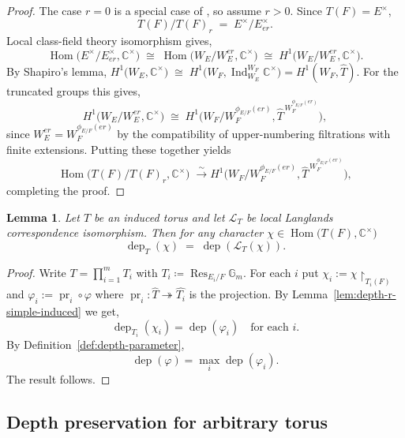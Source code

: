 \documentclass[american]{article}
\numberwithin{equation}{section}
\numberwithin{figure}{section}
\theoremstyle{plain}
\newtheorem{lemma}[theorem]{Lemma}
\theoremstyle{definition}
\theoremstyle{remark}
\DeclareMathOperator{\Hom}{Hom}
\DeclareMathOperator{\dep}{dep}
\DeclareMathOperator{\Res}{Res}
\DeclareMathOperator{\Ind}{Ind}
\DeclareMathOperator{\pr}{pr}
\newcommand{\CC}{\mathbb{C}}
\newcommand{\Gm}{\mathbb{G}_m}
\begin{document}
\begin{proof}
The case \(r=0\) is a special case of \cite[Theorem 1]{MM15}, so assume  \(r>0\).
Since \(T(F)=E^\times\),
\[
T(F)/T(F)_r
\;=\;
E^\times/E^\times_{e r}.
\]Local class-field theory isomorphism gives,
\[
\Hom\!\bigl(E^\times/E^\times_{e r},\CC^\times\bigr)
\;\cong\;
\Hom\!\bigl(W_E/W_E^{e r},\CC^\times\bigr)
\;\cong\;
H^1\!\bigl(W_E/W_E^{e r},\CC^\times\bigr).
\]
By Shapiro's lemma,
\( H^1\!\bigl(W_E,\CC^\times\bigr)\;\cong\;
   H^1\!\bigl(W_F,\Ind_{W_E}^{W_F}\CC^\times\bigr)=H^1(W_F,\widehat{T}) \).
For the truncated groups this gives,
\[
H^1\!\bigl(W_E/W_E^{e r},\CC^\times\bigr)
\;\cong\;
H^1\!\bigl(
   W_F/W_F^{\phi_{E/F}(e r)},
   \widehat{T}^{\,W_F^{\phi_{E/F}(e r)}}
\bigr),
\]
since \(W_E^{e r}=W_F^{\phi_{E/F}(e r)}\) by the compatibility of
upper-numbering filtrations with finite extensions.
Putting these together yields
\[
\Hom\!\bigl(T(F)/T(F)_r,\CC^\times\bigr)
\;\xrightarrow{\;\sim\;}
H^1\!\bigl(
  W_F/W_F^{\phi_{E/F}(e r)},
  \widehat{T}^{\,W_F^{\phi_{E/F}(e r)}}
\bigr),
\]
completing the proof.
\end{proof}
\begin{lemma}\label{lem:depth-pres-ind}
Let \(T\) be an induced torus and let \(\mathcal{L}_T\) be local Langlands correspondence isomorphism. 
Then for any character \(\chi\in\Hom\!\bigl(T(F),\CC^\times\bigr)\)  
\[
\dep_T(\chi)\;=\;\dep(\mathcal{L}_T(\chi)).
\]
\end{lemma}

\begin{proof}
Write \(T=\prod_{i=1}^{m}T_i\) with \(T_i\coloneqq\Res_{E_i/F}\Gm\).  
For each \(i\) put \(\chi_i:=\chi\!\restriction_{T_i(F)}\) and 
\(\varphi_i:=\pr_i\circ\varphi\) where \(\pr_i:\widehat{T}\twoheadrightarrow\widehat{T_i}\) is the
projection.  By Lemma~\ref{lem:depth-r-simple-induced} we get,
\[
\dep_{T_i}(\chi_i)=\dep(\varphi_i)
\quad\text{for each }i.
\tag{\(\dagger\)}
\]
By Definition~\ref{def:depth-parameter}, 
\[
\dep(\varphi)=\max_i\dep(\varphi_i).
\]
The result follows. 
\end{proof}
\subsection{Depth preservation for arbitrary torus}
\end{document}
